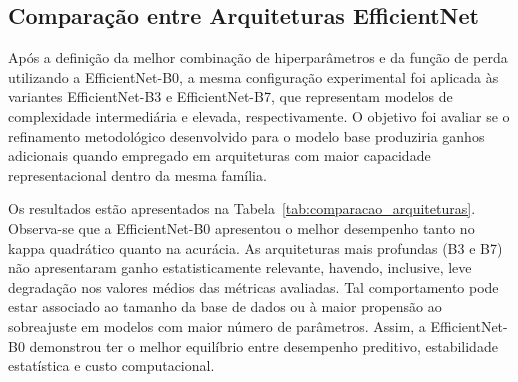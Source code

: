 \subsection{Comparação entre Arquiteturas EfficientNet}

Após a definição da melhor combinação de hiperparâmetros e da função de perda utilizando a EfficientNet-B0, a mesma configuração experimental foi aplicada às variantes EfficientNet-B3 e EfficientNet-B7, que representam modelos de complexidade intermediária e elevada, respectivamente. O objetivo foi avaliar se o refinamento metodológico desenvolvido para o modelo base produziria ganhos adicionais quando empregado em arquiteturas com maior capacidade representacional dentro da mesma família.

Os resultados estão apresentados na Tabela~\ref{tab:comparacao_arquiteturas}. Observa-se que a EfficientNet-B0 apresentou o melhor desempenho tanto no kappa quadrático quanto na acurácia. As arquiteturas mais profundas (B3 e B7) não apresentaram ganho estatisticamente relevante, havendo, inclusive, leve degradação nos valores médios das métricas avaliadas. Tal comportamento pode estar associado ao tamanho da base de dados ou à maior propensão ao sobreajuste em modelos com maior número de parâmetros. Assim, a EfficientNet-B0 demonstrou ter o melhor equilíbrio entre desempenho preditivo, estabilidade estatística e custo computacional. 

\begin{table}[h]
\centering
{}
\caption{Comparação de desempenho entre as variantes da EfficientNet.}
\label{tab:comparacao_arquiteturas}
\end{table}

